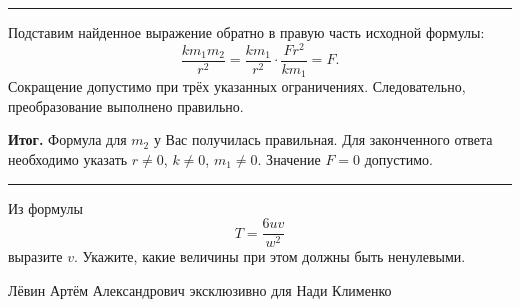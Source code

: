 \documentclass[a4paper,12pt]{article}
\newcommand{\accentline}{\par\noindent\textcolor{accent}{\rule{\linewidth}{0.45pt}}\par}
\newcommand{\reviewheading}[1]{\Needspace{8\baselineskip}\par\vspace{0.75em}{\large\bfseries\textcolor{darkaccent}{#1}}\par\accentline}
\begin{document}
\reviewheading{Проверка}

Подставим найденное выражение обратно в правую часть
исходной формулы:
\[
\frac{k m_1 m_2}{r^2}
=
\frac{k m_1}{r^2}\cdot\frac{F r^2}{k m_1}
=F.
\]
Сокращение допустимо при трёх указанных ограничениях.
Следовательно, преобразование выполнено правильно.

\textcolor{darkaccent}{\textbf{Итог.}}
Формула для \(m_2\) у Вас получилась правильная.
Для законченного ответа необходимо указать
\(r\ne0\), \(k\ne0\), \(m_1\ne0\). Значение \(F=0\) допустимо.

\reviewheading{Задача на закрепление}

Из формулы
\[
  T=\frac{6uv}{w^2}
\]
выразите \(v\). Укажите, какие величины при этом должны быть ненулевыми.

\vfill
\begin{center}
\footnotesize\textcolor{muted}{Лёвин Артём Александрович эксклюзивно для Нади Клименко}
\end{center}
\end{document}
